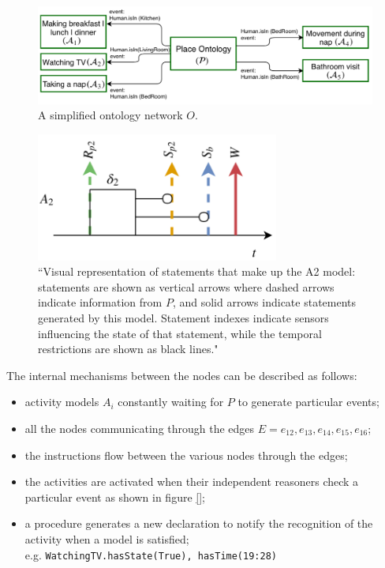 \documentclass{thesisreport}
\begin{document}
  \begin{figure}[h]
	\centering
	\includegraphics[width=15cm]{Thesis/data/O.png}
	\caption{A simplified ontology network $O$.}
	\label{fig:simplifiedOntologyNetwork}
  \end{figure}
   \begin{figure}[H]
	\centering
	\includegraphics[width=8cm]{Thesis/data/event.png}
	\caption{``Visual representation of statements that make up the A2 model: statements are shown as vertical arrows where dashed arrows indicate information from $P$, and solid arrows indicate statements generated by this model. Statement indexes indicate sensors influencing the state of that statement, while the temporal restrictions are shown as black lines."}
	\label{fig:A2}
 \end{figure}

 The internal mechanisms between the nodes can be described as follows:
 \begin{itemize}
     \item activity models $A_i$ constantly waiting for $P$ to generate particular events;
     \item all the nodes communicating through the edges $E = e_{12}, e_{13}, e_{14}, e_{15}, e_{16}$;
     \item the instructions flow between the various nodes through the edges;
     \item the activities are activated when their independent reasoners check a particular event as shown in figure \ref{};
     \item a procedure generates a new declaration to notify the recognition of the activity when a model is satisfied;\\
     e.g. \texttt{WatchingTV.{hasState(True), hasTime(19:28)}}
 \end{itemize}
\end{document}
